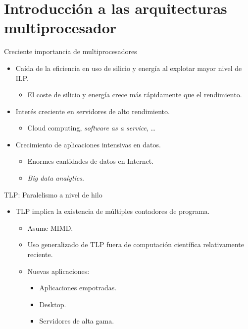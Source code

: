 \section{Introducción a las arquitecturas multiprocesador}

\begin{frame}[t]{Creciente importancia de multiprocesadores}
\begin{itemize}
  \item Caída de la eficiencia en uso de silicio y energía al explotar mayor nivel de ILP.
    \begin{itemize}
      \item El coste de silicio y energía crece más rápidamente que el rendimiento.
    \end{itemize}

  \item Interés creciente en servidores de alto rendimiento.
    \begin{itemize}
      \item Cloud computing, \emph{software as a service}, \ldots
    \end{itemize}

  \item Crecimiento de aplicaciones intensivas en datos.
    \begin{itemize}
      \item Enormes cantidades de datos en Internet.
      \item \emph{Big data analytics}.
    \end{itemize}

\end{itemize}
\end{frame}

\begin{frame}[t]{TLP: Paralelismo a nivel de hilo}
\begin{itemize}
  \item TLP implica la existencia de múltiples contadores de programa.

    \begin{itemize}
      \item Asume MIMD.

      \item Uso generalizado de TLP fuera de computación científica relativamente reciente.

      \item Nuevas aplicaciones:
        \begin{itemize}
          \item Aplicaciones empotradas.
          \item Desktop.
          \item Servidores de alta gama.
        \end{itemize}
    \end{itemize}
\end{itemize}
\end{frame}

